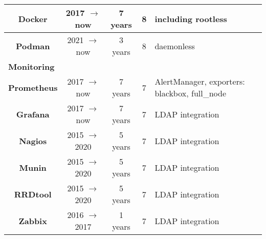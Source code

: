 \documentclass[utf8x,helvetica,narrow,english,logo,totpages]{europecv}
\begin{document}
\begin{europecv}
{\begin{tabular}{ | c | c | c | c | >{\centering\arraybackslash}p{2.282cm} |}
    \textbf{\hspace{-0.2cm} Docker \hspace{-0.20cm}}
        & 2017 $\to$ now
        & 7 years
        & 8
        & \footnotesize{including rootless}
    \\ \hline

    \textbf{\hspace{-0.2cm} Podman \hspace{-0.20cm}}
        & 2021 $\to$ now
        & 3 years
        & 8
        & \footnotesize{daemonless}
    \\ \hline \hline


    \multicolumn{5}{|l|}{\textbf{Monitoring}} \\ \hline

    \textbf{\hspace{-0.2cm} Prometheus \hspace{-0.20cm}}
        & 2017 $\to$ now
        & 7 years
        & 7
        & \footnotesize{AlertManager, exporters: blackbox, full_node}
    \\ \hline

    \textbf{\hspace{-0.2cm} Grafana \hspace{-0.20cm}}
        & 2017 $\to$ now
        & 7 years
        & 7
        & \footnotesize{LDAP integration}
    \\ \hline

    \textbf{\hspace{-0.2cm} Nagios \hspace{-0.20cm}}
        & 2015 $\to$ 2020
        & 5 years
        & 7
        & \footnotesize{LDAP integration}
    \\ \hline

    \textbf{\hspace{-0.2cm} Munin \hspace{-0.20cm}}
        & 2015 $\to$ 2020
        & 5 years
        & 7
        & \footnotesize{LDAP integration}
    \\ \hline

    \textbf{\hspace{-0.2cm} RRDtool \hspace{-0.20cm}}
        & 2015 $\to$ 2020
        & 5 years
        & 7
        & \footnotesize{LDAP integration}
    \\ \hline

    \textbf{\hspace{-0.2cm} Zabbix \hspace{-0.20cm}}
        & 2016 $\to$ 2017
        & 1 years
        & 7
        & \footnotesize{LDAP integration}
    \\ \hline
    

\end{tabular}}
\end{europecv}
\end{document}
